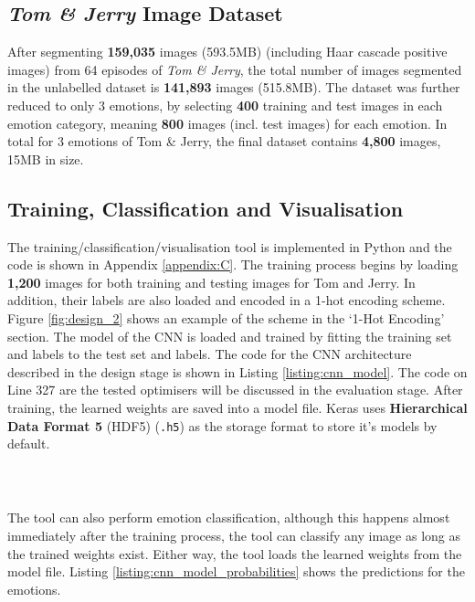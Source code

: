 \documentclass[report, 11pt, oneside]{dissertation}
\begin{document}
\subsection{\textit{Tom \& Jerry} Image Dataset}
After segmenting \textbf{159,035} images (593.5MB) (including Haar cascade positive images) from 64 episodes of \textit{Tom \& Jerry}, the total number of images segmented in the unlabelled dataset is \textbf{141,893} images (515.8MB). The dataset was further reduced to only 3 emotions, by selecting \textbf{400} training and test images in each emotion category, meaning \textbf{800} images (incl. test images) for each emotion. In total for 3 emotions of Tom \& Jerry, the final dataset contains \textbf{4,800} images, 15MB in size.

\subsection{Training, Classification and Visualisation}

The training/classification/visualisation tool is implemented in Python and the code is shown in Appendix \ref{appendix:C}. The training process begins by loading \textbf{1,200} images for both training and testing images for Tom and Jerry. In addition, their labels are also loaded and encoded in a 1-hot encoding scheme. Figure \ref{fig:design_2} shows an example of the scheme in the `1-Hot Encoding' section. The model of the CNN is loaded and trained by fitting the training set and labels to the test set and labels. The code for the CNN architecture described in the design stage is shown in Listing \ref{listing:cnn_model}. The code on Line 327 are the tested optimisers will be discussed in the evaluation stage. After training, the learned weights are saved into a model file. Keras uses \textbf{Hierarchical Data Format 5} (HDF5) (\texttt{.h5}) as the storage format to store it's models by default.

\ \ \ \

\inputminted[frame=single, firstline=311, lastline=339, baselinestretch=1, linenos, breaklines]{python}{train.py}
\label{listing:cnn_model}

The tool can also perform emotion classification, although this happens almost immediately after the training process, the tool can classify any image as long as the trained weights exist. Either way, the tool loads the learned weights from the model file. Listing \ref{listing:cnn_model_probabilities} shows the predictions for the emotions.
\end{document}
